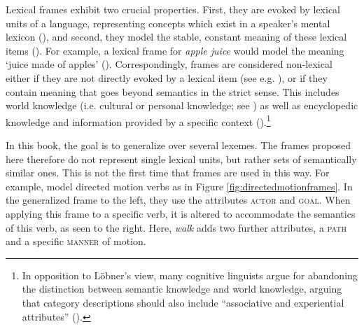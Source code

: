 Lexical frames exhibit two crucial properties. First, they are evoked by lexical units of a language, representing concepts which exist in a speaker's mental lexicon (\citealt[208]{Petersen.2014}), and second, they model the stable, constant meaning of these lexical items (\citealt[297]{Loebner.2013}). For example, a lexical frame for \textit{apple juice} would model the meaning `juice made of apples' (\citealt[295]{Loebner.2013}). 
Correspondingly, frames are considered non-lexical either if they are not directly evoked by a lexical item (see e.g. \citealt[131]{Osswald.2014}), or if they contain meaning that goes beyond semantics in the strict sense. This includes world knowledge (i.e. cultural or personal knowledge; see \citealt[293]{Loebner.2013}) as well as encyclopedic knowledge and information provided by a specific context (\citealt[95]{Ziem.2015}).{\footnote{In opposition to L\"obner's view, many cognitive linguists argue for abandoning the distinction between semantic knowledge and world knowledge, arguing that category descriptions should also include ``associative and experiential attributes'' (\citealt[95]{Ungerer.2006}).}}

In this book, the goal is to generalize over several lexemes. The frames proposed here therefore do not represent single lexical units, but rather sets of semantically similar ones.
This is not the first time that frames are used in this way. For example, \citet{Kallmeyer.2012} model directed motion verbs as in Figure \ref{fig:directedmotionframes}. In the generalized frame to the left, they use the attributes \textsc{actor} and \textsc{goal}. When applying this frame to a specific verb, it is altered to accommodate the semantics of this verb, as seen to the right. Here, \textit{walk} adds two further attributes, a \textsc{path} and a specific \textsc{manner} of motion.

